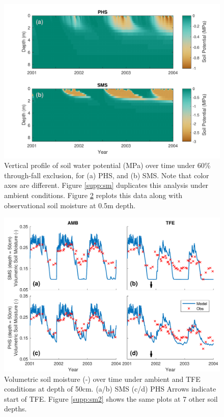 \documentclass[draft,linenumbers]{agujournal}
\begin{document}
  
      \clearpage
    \begin{figure}[h]
     \centering
     \includegraphics[width=30pc]{../figs3/smp.pdf}
     \caption{Vertical profile of soil water potential (MPa) over time under 60\% through-fall exclusion, for
     (a) PHS, and 
     (b) SMS.
     Note that color axes are different.
     Figure \ref{supp:sm} duplicates this analysis under ambient conditions.
     Figure \ref{fig:sm2} replots this data along with observational soil moisture at 0.5m depth. }
     \label{fig:sm}
  \end{figure}
  
        \clearpage
    \begin{figure}[h]
     \centering
     \includegraphics[width=30pc]{../figs3/sm2.pdf}
     \caption{Volumetric soil moisture (-) over time under ambient and TFE conditions at depth of 50cm.
     (a/b) SMS
     (c/d) PHS
     Arrows indicate start of TFE. Figure \ref{supp:sm2} shows the same plots at 7 other soil depths. }
     \label{fig:sm2}
  \end{figure}
\end{document}
